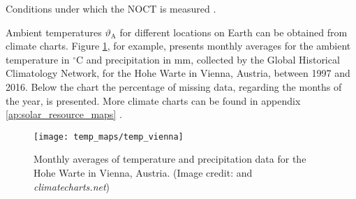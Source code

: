 \begin{table}[h!]
	\centering
	
	\caption{Conditions under which the NOCT is measured \cite{Mertens:2015}.}
	\label{tab:table_NOCT}
\end{table}

Ambient temperatures $\vartheta_{\mathrm{A}}$ for different locations on Earth can be obtained from climate charts. Figure \ref{fig:temp_vienna}, for example, presents monthly averages for the ambient temperature in $^\circ \mathrm{C}$ and precipitation in $\mathrm{mm}$, collected by the Global Historical Climatology Network, for the Hohe Warte in Vienna, Austria, between 1997 and 2016. Below the chart the percentage of missing data, regarding the months of the year, is presented. More climate charts can be found in appendix \ref{ap:solar_resource_maps} \cite{Zepner:2020}.

\begin{figure}[h!]
	\centering
  	\texttt{[image: temp\_maps/temp\_vienna]}
  	\caption{Monthly averages of temperature and precipitation data for the Hohe Warte in Vienna, Austria. (Image credit: \cite{Zepner:2020} and \emph{climatecharts.net})}
	\label{fig:temp_vienna}
\end{figure}

